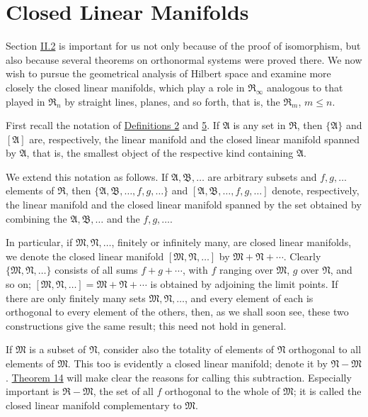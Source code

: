 \documentclass[fontsize=13pt,twoside,openany,headings=normal,parskip=false,bookmarkpackage=false,DIV=calc]{scrbook}
\begin{document}
\section{Closed Linear Manifolds}\label{sec:II.4}
Section \hyperref[sec:II.2]{II.2} is important for us not only because of the proof of isomorphism, but also because several theorems on orthonormal systems were proved there. We now wish to pursue the geometrical analysis of Hilbert space and examine more closely the closed linear manifolds, which play a role in $\mathfrak{R}_\infty$ analogous to that played in $\mathfrak{R}_n$ by straight lines, planes, and so forth, that is, the $\mathfrak{R}_m$, $m\leq n$.

First recall the notation of \hyperref[def:II.2]{Definitions 2} and \hyperref[def:II.5]{5}. If $\mathfrak{A}$ is any set in $\mathfrak{R}$, then $\{\mathfrak{A}\}$ and $[\mathfrak{A}]$ are, respectively, the linear manifold and the closed linear manifold spanned by $\mathfrak{A}$, that is, the smallest object of the respective kind containing $\mathfrak{A}$.

\hypertarget{origpage-39}{}%
We extend this notation as follows. If $\mathfrak{A},\mathfrak{B},\ldots$ are arbitrary subsets and $f,g,\ldots$ elements of $\mathfrak{R}$, then $\{\mathfrak{A},\mathfrak{B},\ldots,f,g,\ldots\}$ and $[\mathfrak{A},\mathfrak{B},\ldots,f,g,\ldots]$ denote, respectively, the linear manifold and the closed linear manifold spanned by the set obtained by combining the $\mathfrak{A},\mathfrak{B},\ldots$ and the $f,g,\ldots$.

In particular, if $\mathfrak{M},\mathfrak{N},\ldots$, finitely or infinitely many, are closed linear manifolds, we denote the closed linear manifold $[\mathfrak{M},\mathfrak{N},\ldots]$ by $\mathfrak{M}+\mathfrak{N}+\cdots$. Clearly $\{\mathfrak{M},\mathfrak{N},\ldots\}$ consists of all sums $f+g+\cdots$, with $f$ ranging over $\mathfrak{M}$, $g$ over $\mathfrak{N}$, and so on; $[\mathfrak{M},\mathfrak{N},\ldots]=\mathfrak{M}+\mathfrak{N}+\cdots$ is obtained by adjoining the limit points. If there are only finitely many sets $\mathfrak{M},\mathfrak{N},\ldots$, and every element of each is orthogonal to every element of the others, then, as we shall soon see, these two constructions give the same result; this need not hold in general.

If $\mathfrak{M}$ is a subset of $\mathfrak{N}$, consider also the totality of elements of $\mathfrak{N}$ orthogonal to all elements of $\mathfrak{M}$. This too is evidently a closed linear manifold; denote it by $\mathfrak{N}-\mathfrak{M}$. \hyperref[thm:II.14]{Theorem 14} will make clear the reasons for calling this subtraction. Especially important is $\mathfrak{R}-\mathfrak{M}$, the set of all $f$ orthogonal to the whole of $\mathfrak{M}$; it is called the closed linear manifold complementary to $\mathfrak{M}$.
\end{document}
